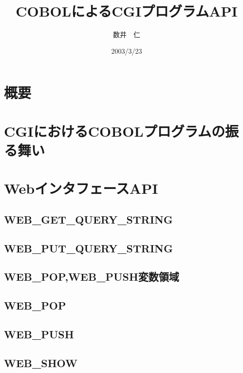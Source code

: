 
\date{2003/3/23}

\title{COBOLによるCGIプログラムAPI}
\author{数井　仁}

\maketitle

\tableofcontents

\newpage

\newpage

\section{概要}

\section{CGIにおけるCOBOLプログラムの振る舞い}


\section{WebインタフェースAPI}

\subsection{WEB\_GET\_QUERY\_STRING}

\subsection{WEB\_PUT\_QUERY\_STRING}

\subsection{WEB\_POP,WEB\_PUSH変数領域}

\subsection{WEB\_POP}

\subsection{WEB\_PUSH}

\subsection{WEB\_SHOW}

